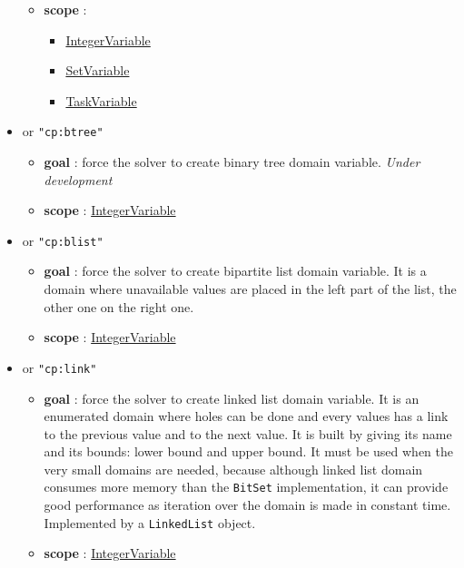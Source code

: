 \begin{itemize}
\begin{itemize}
				\item \textbf{scope} : 
					\begin{itemize} 
						\item \hyperlink{integervariable}{IntegerVariable}
						\item \hyperlink{setvariable}{SetVariable}
						\item  \hyperlink{taskvariable}{TaskVariable}
					\end{itemize}
		\end{itemize}				
		\item \label{vbtree:vbtreeoptions}\hypertarget{vbtree:vbtreeoptions}{}
		 or \texttt{"cp:btree"}
		\begin{itemize}
				\item \textbf{goal} : force the solver to create binary tree domain variable. \emph{Under development}
				\item \textbf{scope} : \hyperlink{integervariable}{IntegerVariable}
		\end{itemize}
		\item \label{vblist:vblistoptions}\hypertarget{vblist:vblistoptions}{}
		 or \texttt{"cp:blist"}
		\begin{itemize}
				\item \textbf{goal} : force the solver to create bipartite list domain variable. It is a domain where unavailable values are placed in the left part of the list, the other one on the right one.
				\item \textbf{scope} : \hyperlink{integervariable}{IntegerVariable}
		\end{itemize}
		\item \label{vlink:vlinkoptions}\hypertarget{vlink:vlinkoptions}{}
		 or \texttt{"cp:link"}
		\begin{itemize}
				\item \textbf{goal} : force the solver to create linked list domain variable. It is an enumerated domain where holes can be done and every values has a link to the previous value and to the next value. It is built by giving its name and its bounds: lower bound and upper bound. It must be used when the very small domains are needed, because although linked list domain consumes more memory than the \texttt{BitSet} implementation, it can provide good performance as iteration over the domain is made in constant time. Implemented by a \texttt{LinkedList} object.
				\item \textbf{scope} : \hyperlink{integervariable}{IntegerVariable}

\end{itemize}
\end{itemize}
